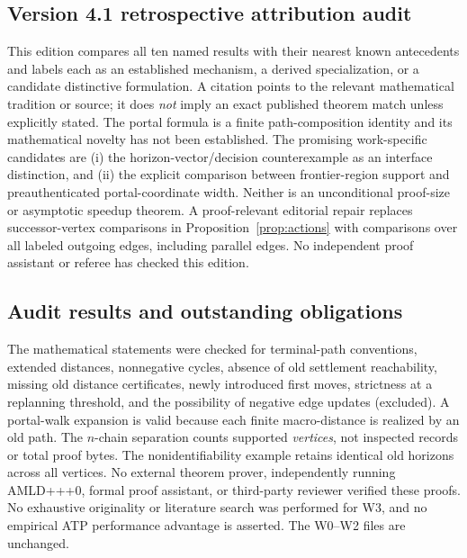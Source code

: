 \documentclass[11pt,letterpaper]{article}
\begin{document}
\subsection*{Version 4.1 retrospective attribution audit}
This edition compares all ten named results with their nearest known antecedents and labels each as an established mechanism, a derived specialization, or a candidate distinctive formulation. A citation points to the relevant mathematical tradition or source; it does \emph{not} imply an exact published theorem match unless explicitly stated. The portal formula is a finite path-composition identity and its mathematical novelty has not been established. The promising work-specific candidates are (i) the horizon-vector/decision counterexample as an interface distinction, and (ii) the explicit comparison between frontier-region support and preauthenticated portal-coordinate width. Neither is an unconditional proof-size or asymptotic speedup theorem. A proof-relevant editorial repair replaces successor-vertex comparisons in Proposition~\ref{prop:actions} with comparisons over all labeled outgoing edges, including parallel edges. No independent proof assistant or referee has checked this edition.

\subsection*{Audit results and outstanding obligations}
The mathematical statements were checked for terminal-path conventions, extended distances, nonnegative cycles, absence of old settlement reachability, missing old distance certificates, newly introduced first moves, strictness at a replanning threshold, and the possibility of negative edge updates (excluded). A portal-walk expansion is valid because each finite macro-distance is realized by an old path. The $n$-chain separation counts supported \emph{vertices}, not inspected records or total proof bytes. The nonidentifiability example retains identical old horizons across all vertices. No external theorem prover, independently running AMLD+++0, formal proof assistant, or third-party reviewer verified these proofs. No exhaustive originality or literature search was performed for W3, and no empirical ATP performance advantage is asserted. The W0--W2 files are unchanged.
\end{document}
